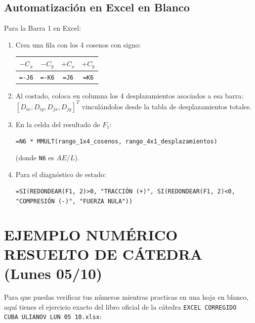 \documentclass[10pt,a4paper]{article}
\begin{document}
\subsection{Automatización en Excel en Blanco}
Para la Barra 1 en Excel:
\begin{enumerate}
    \item Crea una fila con los 4 cosenos con signo:
    \begin{center}
    \begin{tabular}{|c|c|c|c|}
    \hline
    $-C_x$ & $-C_y$ & $+C_x$ & $+C_y$ \\
    \hline
    \texttt{=-J6} & \texttt{=-K6} & \texttt{=J6} & \texttt{=K6} \\
    \hline
    \end{tabular}
    \end{center}
    \item Al costado, coloca en columna los 4 desplazamientos asociados a esa barra: $[D_{ix}, D_{iy}, D_{jx}, D_{jy}]^T$ vinculándolos desde la tabla de desplazamientos totales.
    \item En la celda del resultado de $F_1$:
    \begin{center}
    \texttt{=N6 * MMULT(rango\_1x4\_cosenos, rango\_4x1\_desplazamientos)}
    \end{center}
    (donde \texttt{N6} es $AE/L$).
    \item Para el diagnóstico de estado:
    \begin{center}
    \texttt{=SI(REDONDEAR(F1, 2)>0, "TRACCIÓN (+)", SI(REDONDEAR(F1, 2)<0, "COMPRESIÓN (-)", "FUERZA NULA"))}
    \end{center}
\end{enumerate}

\newpage

\section{EJEMPLO NUMÉRICO RESUELTO DE CÁTEDRA (Lunes 05/10)}

Para que puedas verificar tus números mientras practicas en una hoja en blanco, aquí tienes el ejercicio exacto del libro oficial de la cátedra \texttt{EXCEL CORREGIDO CUBA ULIANOV LUN 05 10.xlsx}:
\end{document}
